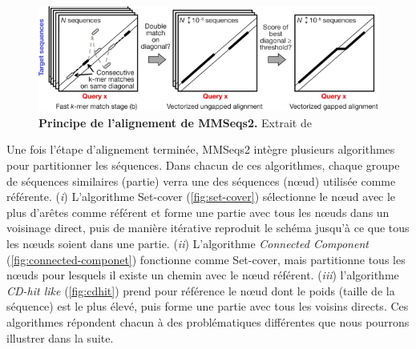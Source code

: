 \begin{figure}[htbp]
    \centering
    \includegraphics[width=\textwidth]{images/mmseqs2.png}
    \caption[Principe de l'alignement de MMSeqs2.]{\textbf{Principe de l'alignement de MMSeqs2.}  Extrait de \cite{steinegger_mmseqs2_2017}}
    \label{fig:mmseqs2}
\end{figure}

Une fois l'étape d'alignement terminée, MMSeqs2 intègre plusieurs algorithmes pour partitionner les séquences. Dans chacun de ces algorithmes, chaque groupe de séquences similaires (partie) verra une des séquences (n\oe ud) utilisée comme référente. (\textit{i}) L'algorithme Set-cover (\autoref{fig:set-cover}) sélectionne le n\oe ud avec le plus d'arêtes comme référent et forme une partie avec tous les n\oe uds dans un voisinage direct, puis de manière itérative reproduit le schéma jusqu'à ce que tous les n\oe uds soient dans une partie. (\textit{ii}) L'algorithme \textit{Connected Component} (\autoref{fig:connected-componet}) fonctionne comme Set-cover, mais partitionne tous les n\oe uds pour lesquels il existe un chemin avec le n\oe ud référent. (\textit{iii})  l'algorithme \textit{CD-hit like} (\autoref{fig:cdhit}) prend pour référence le n\oe ud dont le poids (taille de la séquence) est le plus élevé, puis forme une partie avec tous les voisins directs. Ces algorithmes répondent chacun à des problématiques différentes que nous pourrons illustrer dans la suite.  

